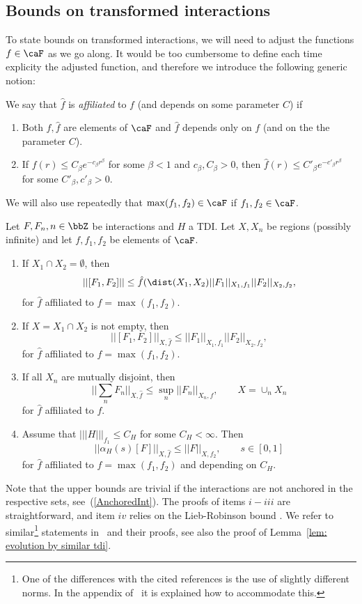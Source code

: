 \subsection{Bounds on transformed interactions}\label{sec: bounds on transformed interactions}

To state bounds on transformed interactions, we will need to adjust the functions $f\in\caF$ as we go along.   It would be too cumbersome to define each time explicity the adjusted function, and therefore we introduce the following generic notion:


\begin{definition}\label{def: derived function}
	We say that $\hat{f}$ is \emph{affiliated} to $f$ (and depends on some parameter $C$) if
	\begin{enumerate}
		\item Both $f,\hat{f}$ are elements of $\caF$ and $\hat{f}$ depends only on $f$ (and on the the parameter $C$).  
		\item If $f(r)\leq C_\beta e^{-c_\beta r^\beta}$ for some $\beta<1$ and $c_\beta,C_\beta>0$, then $\hat{f}(r)\leq C'_\beta e^{-c'_\beta r^\beta}$ for some $C'_\beta,c'_\beta>0$.
	\end{enumerate}
\end{definition}
We will also use repeatedly that $\max(f_1,f_2) \in \caF$ if $f_1,f_2 \in\caF$.

\begin{lemma}\label{lem: loc and liebrobinson}
	Let $F,F_{n}, n\in \bbZ$ be interactions and $H$ a TDI. Let $X,X_n$ be regions (possibly infinite) and let $f,f_1,f_2$ be elements of $\caF$. 
	\begin{enumerate}
		\item If   $X_1\cap X_2=\emptyset $, then 
		$$||[F_1,F_2] || \leq  \hat{f}(\dist(X_1,X_2) || F_1||_{X_1,f_1}  || F_2||_{X_2,f_2},    $$
		for $\hat{f}$ affiliated to $f=\max(f_1,f_2)$.
		\item  If $X=X_1\cap X_2 $ is not empty, then 
		$$||[F_1,F_2]||_{X,\hat{f}} \leq   ||F_1 ||_{X_1,f_1}   ||F_2||_{X_2,f_2}, $$
		for $\hat{f}$ affiliated to $f=\max(f_1,f_2)$.
		\item If all $X_n$ are mutually disjoint, then 
		$$||\sum_{n}  F_n||_{X,\hat{f}} \leq \sup_n || F_n||_{X_n,f},\qquad  X=\cup_n X_n$$
		for $\hat{f}$ affiliated to $f$.
		\item  Assume that $|||H|||_{f_1} \leq C_H $ for some $C_H<\infty$. Then
		$$ ||  \alpha_H(s)[F] ||_{X,\hat{f}} \leq     ||F||_{X,f_2},  \qquad s\in [0,1]
		$$
		for $\hat{f}$ affiliated to $f=\max(f_1,f_2)$ and depending on $C_H$.
	\end{enumerate}
\end{lemma}
Note that the upper bounds are trivial if the interactions are not anchored in the respective sets, see~(\ref{AnchoredInt}). The proofs of items $i-iii$ are straightforward, and item $iv$ relies on the Lieb-Robinson bound \cite{Lieb:1972ts} . We refer to similar\footnote{One of the differences with the cited references is the use of slightly different norms. In the appendix of~\cite{Stability} it is explained how to accommodate this.} statements in~\cite{nachtergaele2019quasi,bachmann2022trotter} and their proofs, see also the proof of Lemma~\ref{lem: evolution by similar tdi}.


